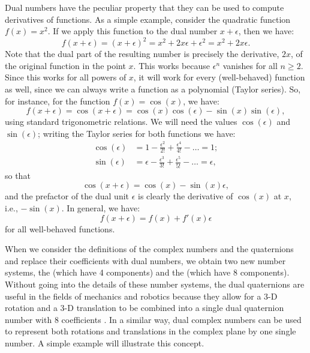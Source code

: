 Dual numbers have the peculiar property that they can be used to compute derivatives of functions.  As a simple example, consider the quadratic function $f(x)=x^2$.  If we apply this function to the dual number $x+\epsilon$, then we have:
\[
	f(x+\epsilon) = (x+\epsilon)^2 = x^2+2x\epsilon+\epsilon^2 = x^2+2x\epsilon.
\]
Note that the dual part of the resulting number is precisely the derivative, $2x$, of the original function in the point $x$.  This works because $\epsilon^n$ vanishes for all $n\ge 2$.  Since this works for all powers of $x$, it will work for every (well-behaved) function as well, since we can always write a function as a polynomial (Taylor series).  So, for instance, for the function $f(x) = \cos(x)$, we have:
\begin{equation}
	f(x+\epsilon) = \cos(x+\epsilon) = \cos(x)\cos(\epsilon)-\sin(x)\sin(\epsilon),
\end{equation}
using standard trigonometric relations. We will need the values $\cos(\epsilon)$ and $\sin(\epsilon)$; writing the Taylor series for both functions we have:
\begin{equation}
\begin{split}
	\cos(\epsilon) &= 1-\frac{\epsilon^2}{2!}+\frac{\epsilon^4}{4!} - \ldots = 1;\\
	\sin(\epsilon) &= \epsilon-\frac{\epsilon^3}{3!}+\frac{\epsilon^5}{5!} - \ldots =\epsilon, 
\end{split}
\end{equation}
so that
\begin{equation}
	\cos(x+\epsilon) = \cos(x)-\sin(x)\epsilon,
\end{equation}
and the prefactor of the dual unit $\epsilon$ is clearly the derivative of $\cos(x)$ at $x$, i.e., $-\sin(x)$. In general, we have:
\begin{equation}
	f(x+\epsilon) = f(x) +f'(x)\epsilon
\end{equation}
for all well-behaved functions.  

When we consider the definitions of the complex numbers and the quaternions and replace their coefficients with dual numbers, we obtain two new number systems, the  (which have 4 components) and the  (which have 8 components).  Without going into the details of these number systems, the dual quaternions are useful in the fields of mechanics and robotics because they allow for a 3-D rotation and a 3-D translation to be combined into a single dual quaternion number with $8$ coefficients \cite{farias2024a}.   In a similar way, dual complex numbers can be used to represent both rotations and translations in the complex plane by one single number.  A simple example will illustrate this concept.  

